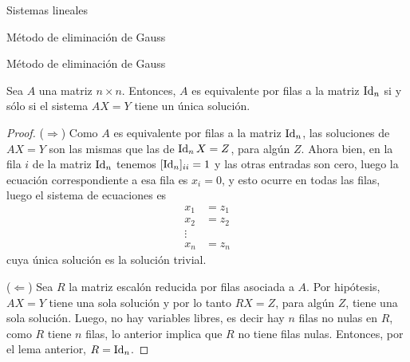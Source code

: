 \begin{chapter}{Sistemas lineales}
\begin{section}{Método de eliminación de Gauss }
\begin{subsection}{Método de eliminación de Gauss}
    \begin{teorema}
        Sea $A$ una matriz $n \times n$. Entonces, $A$ es equivalente por filas a la matriz $\operatorname{Id}_n$  si y sólo si el sistema $AX = Y$ tiene un única solución. 
    \end{teorema}
    \begin{proof}
        ($\Rightarrow$) Como $A$ es equivalente por filas a la matriz $\operatorname{Id}_n$, las soluciones de $AX =Y$ son las mismas que las de $\operatorname{Id}_nX=Z$, para algún $Z$. Ahora bien,  en la fila $i$ de la matriz $\operatorname{Id}_n$ tenemos $[\operatorname{Id}_n]_{ii} =1$ y las otras entradas son cero, luego la ecuación correspondiente a esa fila es $x _i =0$, y esto ocurre en todas las filas, luego el sistema de ecuaciones es
        \begin{align*}
        x_1 &=z_1 \\ x_2 &= z_2 \\ \vdots \\ x_n &= z_n
        \end{align*}
        cuya única solución es la solución trivial.
        
        ($\Leftarrow$) Sea $R$ la matriz escalón reducida por filas asociada a $A$. Por hipótesis, $AX=Y$ tiene una sola solución y  por lo tanto $RX=Z$, para algún $Z$, tiene una sola solución. Luego, no hay variables libres, es decir hay $n$ filas no nulas en $R$, como $R$ tiene $n$ filas, lo anterior implica que $R$ no tiene filas nulas. Entonces, por el lema anterior, $R=\operatorname{Id}_n$.
    \end{proof}
    \end{subsection}


\end{section}
\end{chapter}
